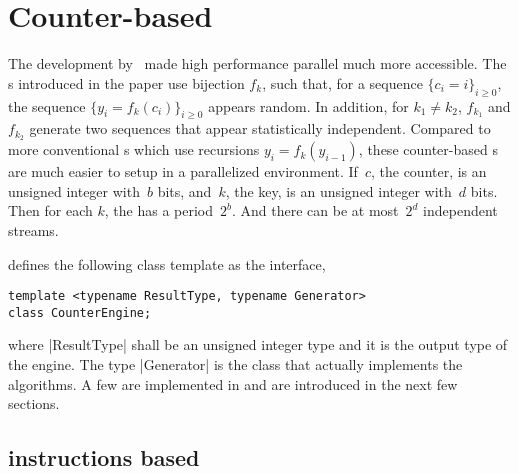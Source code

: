 \section{Counter-based \texorpdfstring{\rng}{RNG}}
\label{sec:Counter-based RNG}

The development by~\cite{Salmon:2011um} made high performance parallel \rng
much more accessible. The \rng{}s introduced in the paper use bijection $f_k$,
such that, for a sequence $\{c_i = i\}_{i\ge0}$, the sequence $\{y_i =
f_k(c_i)\}_{i\ge0}$ appears random. In addition, for $k_1 \ne k_2$, $f_{k_1}$
and $f_{k_2}$ generate two sequences that appear statistically independent.
Compared to more conventional \rng{}s which use recursions $y_i = f_k(y_{i -
1})$, these counter-based \rng{}s are much easier to setup in a parallelized
environment. If~$c$, the counter, is an unsigned integer with~$b$ bits,
and~$k$, the key, is an unsigned integer with~$d$ bits. Then for each $k$, the
\rng has a period~$2^b$. And there can be at most~$2^d$ independent streams.

\mckl defines the following class template as the interface,
\begin{verbatim}
template <typename ResultType, typename Generator>
class CounterEngine;
\end{verbatim}
where |ResultType| shall be an unsigned integer type and it is the output type
of the \rng engine. The type |Generator| is the class that actually implements
the algorithms. A few are implemented in \mckl and are introduced in the next
few sections.

\subsection{\texorpdfstring{\aesni}{AES-NI} instructions based
\texorpdfstring{\rng}{RNG}}
\label{sub:AES-NI instructions based RNG}

